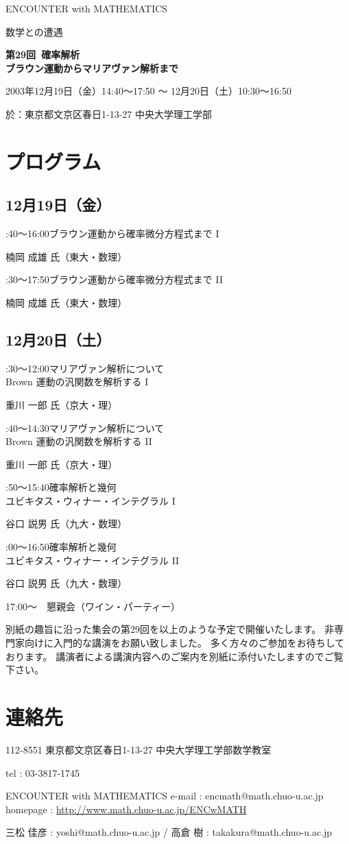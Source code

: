 \documentclass[uplatex,dvipdfmx]{jlreq}
\newcommand{\talk}[3]{%
\noindent
#1\quad #2\par
\hspace*{2em}#3\par\smallskip
}
\newcommand{\EwMnumber}{第29回}
\newcommand{\EwMtitle}{確率解析\\[2mm]\large ブラウン運動からマリアヴァン解析まで}
\newcommand{\EwMdate}{2003年12月19日（金）14:40～17:50 ～ 12月20日（土）10:30～16:50}
\newcommand{\EwMplace}{東京都文京区春日1-13-27 中央大学理工学部}
\newcommand{\EwMtitleblock}{

\vspace*{-5mm}

\begin{center}

{\Large ENCOUNTER with MATHEMATICS}

\vspace{2mm}

{\large 数学との遭遇}

\vspace{4mm}

{\Large \bfseries \EwMnumber\ \EwMtitle}

\vspace{4mm}

\EwMdate

\vspace{2mm}

於：\EwMplace

\end{center}

\vspace{2mm}

}
\begin{document}
\EwMtitleblock


\section*{プログラム}

\subsection*{12月19日（金）}

\talk
{14:40～16:00}
{ブラウン運動から確率微分方程式まで I}
{楠岡 成雄 氏（東大・数理）}

\talk
{16:30～17:50}
{ブラウン運動から確率微分方程式まで II}
{楠岡 成雄 氏（東大・数理）}

\subsection*{12月20日（土）}

\talk
{10:30～12:00}
{マリアヴァン解析について\\[1mm]Brown 運動の汎関数を解析する I}
{重川 一郎 氏（京大・理）}

\talk
{13:40～14:30}
{マリアヴァン解析について\\[1mm]Brown 運動の汎関数を解析する II}
{重川 一郎 氏（京大・理）}

\talk
{14:50～15:40}
{確率解析と幾何\\[1mm]ユビキタス・ウィナー・インテグラル I}
{谷口 説男 氏（九大・数理）}

\talk
{16:00～16:50}
{確率解析と幾何\\[1mm]ユビキタス・ウィナー・インテグラル II}
{谷口 説男 氏（九大・数理）}

\bigskip

17:00～　懇親会（ワイン・パーティー）


\bigskip

別紙の趣旨に沿った集会の第29回を以上のような予定で開催いたします。  
非専門家向けに入門的な講演をお願い致しました。  
多く方々のご参加をお待ちしております。  
講演者による講演内容へのご案内を別紙に添付いたしますのでご覧下さい。


\section*{連絡先}

112-8551 東京都文京区春日1-13-27 中央大学理工学部数学教室 

tel : 03-3817-1745  

ENCOUNTER with MATHEMATICS  
e-mail : encmath@math.chuo-u.ac.jp  
homepage : \url{http://www.math.chuo-u.ac.jp/ENCwMATH}  

三松 佳彦 : yoshi@math.chuo-u.ac.jp / 高倉 樹 : takakura@math.chuo-u.ac.jp
\end{document}
